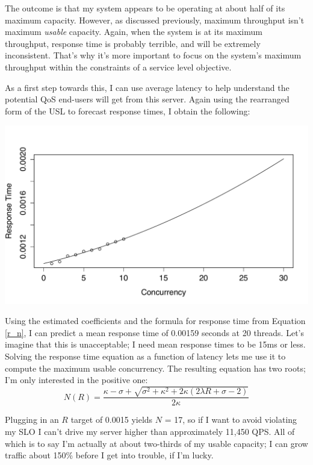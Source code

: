 \documentclass{vivid_layout}
\begin{document}
The outcome is that my system appears to be operating at about half of its
maximum capacity. However, as discussed previously, maximum throughput isn't
maximum {\itshape usable} capacity. Again, when the system is at its maximum
throughput, response time is probably terrible, and will be extremely
inconsistent. That's why it's more important to focus on the system's maximum
throughput within the constraints of a service level objective.

As a first step towards this, I can use average latency to help understand the
potential QoS end-users will get from this server. Again using the rearranged
form of the USL to forecast response times, I obtain the following:
\begin{center}
\includegraphics[width=.85\linewidth]{scalability/cisco-3}
\end{center}

Using the estimated coefficients and the formula for response time from Equation
\ref{r_n}, I can predict a mean response time
of 0.00159 seconds at 20 threads. Let's imagine that this is unacceptable; I
need mean response times to be 15ms or less. Solving the response time equation
as a function of latency lets me use it to compute the maximum usable
concurrency. The resulting equation has two roots; I'm only interested in the
positive one:
\begin{equation}
N(R)=\frac{\kappa-\sigma+\sqrt{\sigma^2+\kappa^2+2\kappa(2\lambda R+\sigma-2)}} {2\kappa}
\label{n_r}
\end{equation}

Plugging in an $R$ target of 0.0015 yields $N$ = 17, so if I want to avoid
violating my SLO I can't drive my server higher than approximately 11,450 QPS.
All of which is to say I'm actually at about two-thirds of my usable capacity; I
can grow traffic about 150\% before I get into trouble, if I'm lucky.
\end{document}
